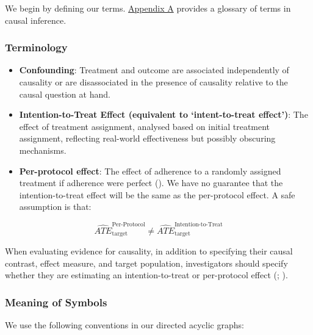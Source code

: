 \documentclass[
  single column]{article}
\begin{document}
We begin by defining our terms. \hyperref[id-app-a]{Appendix A} provides
a glossary of terms in causal inference.

\subsubsection{Terminology}\label{terminology}

\begin{itemize}
\item
  \textbf{Confounding}: Treatment and outcome are associated
  independently of causality or are disassociated in the presence of
  causality relative to the causal question at hand.
\item
  \textbf{Intention-to-Treat Effect (equivalent to `intent-to-treat
  effect')}: The effect of treatment assignment, analysed based on
  initial treatment assignment, reflecting real-world effectiveness but
  possibly obscuring mechanisms.
\item
  \textbf{Per-protocol effect}: The effect of adherence to a randomly
  assigned treatment if adherence were perfect
  (). We have no
  guarantee that the intention-to-treat effect will be the same as the
  per-protocol effect. A safe assumption is that:
\end{itemize}

\[
\widehat{ATE}_{\text{target}}^{\text{Per-Protocol}} \ne \widehat{ATE}_{\text{target}}^{\text{Intention-to-Treat}}
\]

When evaluating evidence for causality, in addition to specifying their
causal contrast, effect measure, and target population, investigators
should specify whether they are estimating an intention-to-treat or
per-protocol effect (;
).

\subsubsection{Meaning of Symbols}\label{meaning-of-symbols}

We use the following conventions in our directed acyclic graphs:
\end{document}
